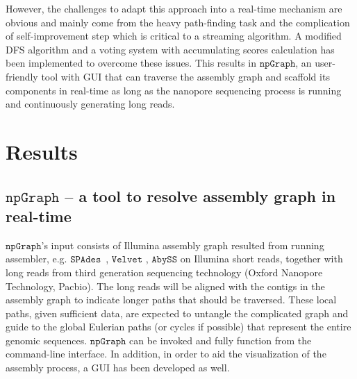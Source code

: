 \documentclass[10pt,twocolumn,twoside]{genpaper}
\newcommand{\npgraph}{$\mathtt{npGraph}$}
\newcommand{\spades}{$\mathtt{SPAdes}$}
\begin{document}
However, the challenges to adapt this approach into a real-time mechanism are obvious and mainly come from the heavy path-finding task and the complication of self-improvement step which is critical to a streaming algorithm. 
A modified DFS algorithm and a voting system with accumulating scores calculation has been implemented to overcome these issues.
This results in \npgraph{}, an user-friendly tool with GUI that can traverse the assembly graph and scaffold its components in real-time as long as the nanopore sequencing process is running and continuously generating long reads.  
\section*{Results}
\subsection*{\npgraph{} -- a tool to resolve assembly graph in real-time}
\npgraph{}'s input consists of Illumina assembly graph resulted from running assembler, e.g. \spades{}~\cite{BankevichNA2012}, $\mathtt{Velvet}$ \cite{Zerbino2008}, $\mathtt{AbySS}$ \cite{Simpson2009} on Illumina short reads, together with long reads from third generation sequencing technology (Oxford Nanopore Technology, Pacbio).
The long reads will be aligned with the contigs in the assembly graph to indicate longer paths that should be traversed. These local paths, given sufficient data, are expected to untangle the complicated graph and guide to the global Eulerian paths (or cycles if possible) that represent the entire genomic sequences. 
\npgraph{} can be invoked and fully function from the command-line interface. In addition, in order to aid the visualization of the assembly process, a GUI has been developed as well.
\end{document}
